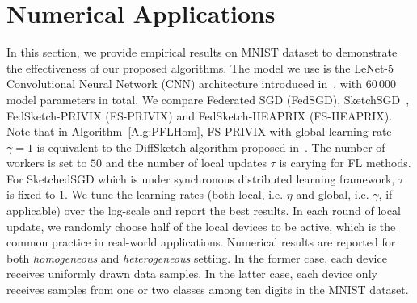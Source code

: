 \documentclass[twoside]{article}
\begin{document}
\vspace{-0.05in}
\section{Numerical Applications}\label{sec:experimnt}
\vspace{-0.05in}

In this section, we provide empirical results on MNIST dataset to demonstrate the effectiveness of our proposed algorithms. 
The model we use is the LeNet-5 Convolutional Neural Network (CNN) architecture introduced in~\cite{lecun1998gradient}, with $60\,000$ model parameters in total.
We compare Federated SGD (FedSGD), SketchSGD~\cite{ivkin2019communication}, FedSketch-PRIVIX (FS-PRIVIX) and FedSketch-HEAPRIX (FS-HEAPRIX).
Note that in Algorithm~\ref{Alg:PFLHom}, FS-PRIVIX with global learning rate $\gamma=1$ is equivalent to the DiffSketch algorithm proposed in~\cite{li2018federated}. 
The number of workers is set to $50$ and the number of local updates $\tau$ is carying for FL methods. 
For SketchedSGD which is under synchronous distributed learning framework, $\tau$ is fixed to $1$. 
We tune the learning rates (both local, i.e. $\eta$ and global, i.e. $\gamma$, if applicable) over the log-scale and report the best results.
In each round of local update, we randomly choose half of the local devices to be active, which is the common practice in real-world applications. 
Numerical results are reported for both \emph{homogeneous} and \emph{heterogeneous} setting. 
In the former case, each device receives uniformly drawn data samples. 
In the latter case, each device only receives samples from one or two classes among ten digits in the MNIST dataset. 
\end{document}
